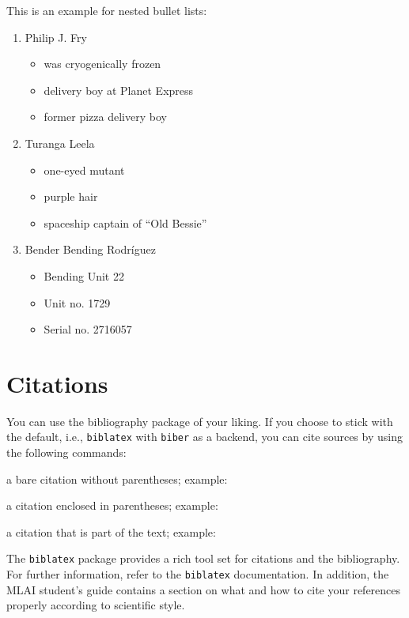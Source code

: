 This is an example for nested bullet lists: 
\begin{enumerate} 
	\item Philip J. Fry 
	\begin{itemize} 
		\item was cryogenically frozen 
		\item delivery boy at Planet Express
		\item former pizza delivery boy
	\end{itemize}
	\item Turanga Leela 
	\begin{itemize}
		\item one-eyed mutant
		\item purple hair 
		\item spaceship captain of \enquote{Old Bessie} 
	\end{itemize}
	\item Bender Bending Rodr\'{i}guez
	\begin{itemize}
		\item Bending Unit 22
		\item Unit no. 1729
		\item Serial no. 2716057
	\end{itemize}
\end{enumerate}

\section{Citations}
 
You can use the bibliography package of your liking. If you choose to stick with the default, i.e., \texttt{biblatex} with \texttt{biber} as a backend, you can cite sources by using the following commands: 
\begin{description}[font=\normalfont\ttfamily]
	\item[\textbackslash{}cite] a bare citation without parentheses; example: \cite{adams1979} 
	\item[\textbackslash{}parencite] a citation enclosed in parentheses; example: \parencite{adams1979} 
	\item[\textbackslash{}textcite] a citation that is part of the text; example: \textcite{adams1979} 
\end{description}
The \texttt{biblatex} package provides a rich tool set for citations and the bibliography. For further information, refer to the \texttt{biblatex} documentation. %
In addition, the MLAI student's guide contains a section on what and how to cite your references properly according to scientific style. %